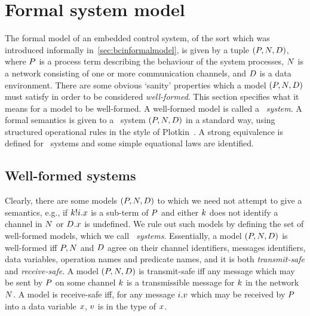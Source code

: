 \section{Formal system model \label{sec:bcformalmodel}}
The formal model of an embedded control system, of the sort which was
introduced informally in~\Sec\ref{sec:bcinformalmodel}, is given by a
tuple $(\P,\N,\D)$, where $\P$ is a process term describing the
behaviour of the system processes, $\N$ is a network consisting of one or
more communication channels, and $\D$ is a data environment. There are
some obvious `sanity' properties which a model $(\P,\N,\D)$ must
satisfy in order to be considered \emph{well-formed}.  This section specifies
what it means for a model to be well-formed. A well-formed model is
called a \emph{\bcandle\ system}. A formal semantics is given to a
\bcandle\ system $(\P,\N,\D)$ in a standard way, using structured
operational rules in the style of Plotkin~\cite{plo:81}. A strong
equivalence is defined for \bcandle\ systems and some simple
equational laws are identified. 

\subsection{Well-formed systems}
Clearly, there are some models $(\P,\N,\D)$ to which we need not
attempt to give a semantics, e.g., if $\kk!\ii.\xx$ is a sub-term of
$\P$ and either $\kk$ does not identify a channel in $\N$ or $\D.\xx$
is undefined. We rule out such models by defining the set of
well-formed models, which we call
\emph{\bcandle\ systems}. Essentially, a model $(\P,\N,\D)$ is well-formed iff
$\P, \N$ and $\D$ agree on their channel identifiers, messages identifiers,
data variables, operation names and predicate names, and it is both
\emph{transmit-safe} and \emph{receive-safe}. A model $(\P,\N,\D)$ is 
transmit-safe iff any message which may be sent by $\P$ on some
channel $\kk$ is a transmissible message for $\kk$ in the network
$\N$. A model is receive-safe iff, for any message $\ii.\vv$ which may be 
received by $\P$ into a data variable $\xx$, $\vv$ is in the type
of $\xx$.

